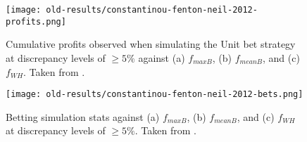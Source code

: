 \begin{figure}
    \centering
    \texttt{[image: old-results/constantinou-fenton-neil-2012-profits.png]}
    \caption{Cumulative profits observed when simulating the Unit bet strategy at discrepancy levels of $\geq 5\%$ against (a) $f_{maxB}$, (b) $f_{meanB}$, and (c) $f_{WH}$. Taken from \citet{bib:constantinou-fenton-neil-2012}.}
    \label{fig:app-constantinou-fenton-neil-2012-profits}
\end{figure}

\begin{figure}
    \centering
    \texttt{[image: old-results/constantinou-fenton-neil-2012-bets.png]}
    \caption{Betting simulation stats against (a) $f_{maxB}$, (b) $f_{meanB}$, and (c) $f_{WH}$ at discrepancy levels of $\geq 5\%$. Taken from \citet{bib:constantinou-fenton-neil-2012}.}
    \label{fig:app-constantinou-fenton-neil-2012-bets}
\end{figure}